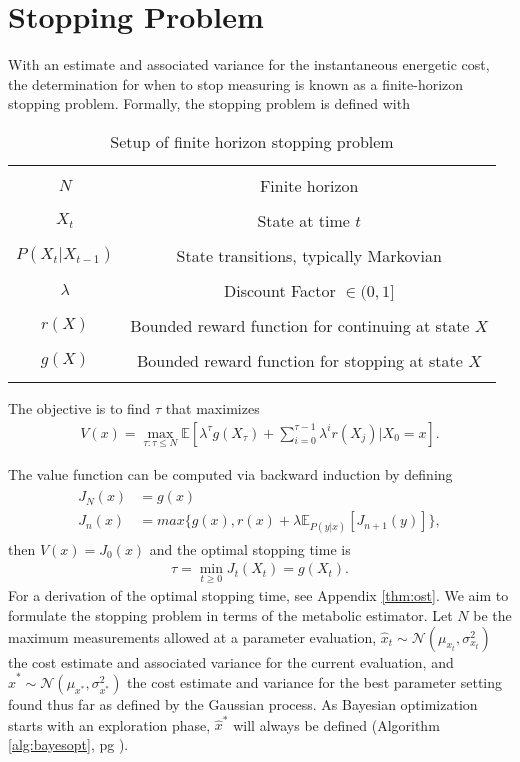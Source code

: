\section{Stopping Problem}
With an estimate and associated variance for the instantaneous energetic cost, the determination for when to stop measuring is known as a finite-horizon stopping problem. Formally, the stopping problem is defined with

\begin{table}[h]
\centering
\begin{tabular}{ |c  c| }
  \hline&\\
  $N$ & Finite horizon\\
  &\\
  $X_t$ & State at time $t$\\
  &\\
  $P(X_t \vert X_{t-1})$ & State transitions, typically Markovian\\
  &\\
  $\lambda$ & Discount Factor $\in (0, 1]$\\
  &\\
  $r(X)$ & Bounded reward function for continuing at state $X$\\
  &\\
  $g(X)$ & Bounded reward function for stopping at state $X$\\
  &\\
  \hline
\end{tabular}
\caption{Setup of finite horizon stopping problem}
\label{tab:stopping}
\end{table}

The objective is to find $\tau$ that maximizes
\begin{align}
  V(x) = \max_{\tau: \tau \leq N} \mathbb{E}[\lambda^{\tau} g(X_{\tau}) + \sum_{i=0}^{\tau-1} \lambda^{i}r(X_j) \vert X_0 = x].
\end{align}

The value function can be computed via backward induction by defining
\begin{align}
\begin{split}
  J_N(x) &= g(x)\\
  J_n(x) &= max\{g(x), r(x) + \lambda\mathbb{E}_{P(y\vert x)}[J_{n+1}(y)]\},
\end{split}
\end{align}
then $V(x) = J_0(x)$ and the optimal stopping time is
\begin{align}
  \tau = \min_{t \geq 0}J_t(X_t) = g(X_t).
\end{align}
For a derivation of the optimal stopping time, see Appendix \ref{thm:ost}. We aim to formulate the stopping problem in terms of the metabolic estimator. Let $N$ be the maximum measurements allowed at a parameter evaluation, $\hat{x}_t \sim \mathcal{N}(\mu_{x_t}, \sigma^2_{x_t})$ the cost estimate and associated variance for the current evaluation, and $\hat{x}^* \sim \mathcal{N}(\mu_{x^*}, \sigma^2_{x^*})$ the cost estimate and variance for the best parameter setting found thus far as defined by the Gaussian process. As Bayesian optimization starts with an exploration phase, $\hat{x}^*$ will always be defined (Algorithm \ref{alg:bayesopt}, pg \pageref{alg:bayesopt}).

